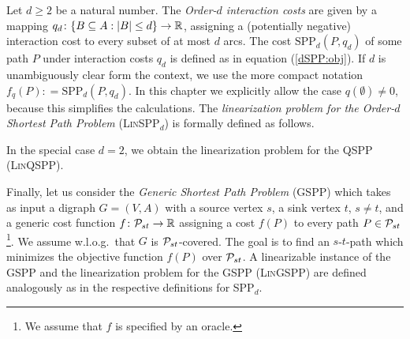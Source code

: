 Let $d \geq 2$ be a natural number. The \emph{Order-$d$ interaction costs} are given by a mapping $q_d\colon \{ B \subseteq A : |B| \leq d \}\to \mathbb{R}$, assigning a (potentially negative) interaction cost to every subset of at most $d$ arcs.
The cost $\text{SPP}_d(P,q_d)$ of some path $P$ under interaction costs $q_d$ is defined as in equation (\ref{dSPP:obj}).
If $d$ is unambiguously clear form the context, we use the  more compact notation $f_q(P): = \text{SPP}_d(P,q_d)$.
 In this chapter we explicitly allow the case $q(\emptyset) \neq 0$, because this simplifies the calculations.  
The \emph{linearization problem for the Order-$d$ Shortest Path Problem} (\textsc{Lin}SPP$_d$)
is formally defined as follows.
\begin{center}
\end{center}
In the special case $d = 2$, we obtain the    linearization problem for the QSPP (\textsc{Lin}QSPP).
\smallskip

Finally, let us consider the \emph{Generic Shortest Path Problem} (GSPP) which takes as input  a digraph $G=(V,A)$ with a source vertex $s$, a sink vertex $t$, $s\neq t$, and a generic cost function $f\colon \mathcal{P}_{st} \to \mathbb{R}$  assigning  a cost $f(P)$ to every path $P\in \mathcal{P}_{st}$\footnote{We assume that $f$ is specified by an oracle.}. We assume w.l.o.g.\ that $G$ is $\mathcal{P}_{st}$-covered. The goal is to find an $s$-$t$-path  which minimizes the objective function $f(P)$ over $\mathcal{P}_{st}$. 
A linearizable instance of  the GSPP and the linearization problem for the GSPP (\textsc{Lin}GSPP) are  defined analogously as in the respective definitions for SPP$_d$.



